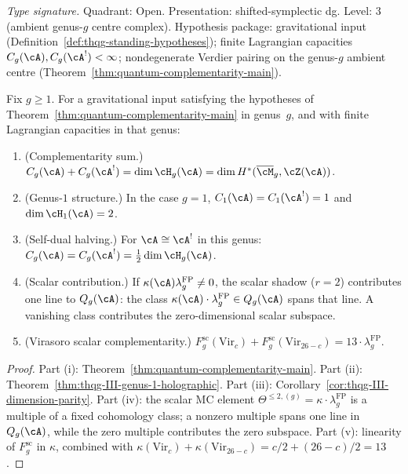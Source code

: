 \begin{theorem}
\label{thm:thqg-lagrangian-constraint}
\textit{Type signature.}
Quadrant: Open. Presentation: shifted-symplectic dg.
Level: $3$ (ambient genus-$g$ centre complex).
Hypothesis package: gravitational input
\textup{(}Definition~\ref{def:thqg-standing-hypotheses}\textup{)};
finite Lagrangian capacities $C_g(\cA), C_g(\cA^!) < \infty$;
nondegenerate Verdier pairing on the genus-$g$ ambient centre
\textup{(}Theorem~\ref{thm:quantum-complementarity-main}\textup{)}.

\medskip
Fix $g\ge1$.  For a gravitational input satisfying the hypotheses of
Theorem~\ref{thm:quantum-complementarity-main} in genus~$g$, and with
finite Lagrangian capacities in that genus:
\begin{enumerate}[label=\textup{(\roman*)}]
\item \textup{(Complementarity sum.)}
 $C_g(\cA) + C_g(\cA^!) = \dim \cH_g(\cA)
 = \dim H^*(\overline{\cM}_g, \cZ(\cA))$.

\item \textup{(Genus-$1$ structure.)}
 In the case $g=1$,
 $C_1(\cA) = C_1(\cA^!) = 1$ and $\dim \cH_1(\cA) = 2$.

\item \textup{(Self-dual halving.)}
 For $\cA \cong \cA^!$ in this genus:
 $C_g(\cA) = C_g(\cA^!)
 = \tfrac{1}{2}\dim \cH_g(\cA)$.

\item \textup{(Scalar contribution.)}
 If $\kappa(\cA)\lambda_g^{\mathrm{FP}}\neq0$, the scalar shadow
 ($r = 2$) contributes one line to $Q_g(\cA)$: the class
 $\kappa(\cA) \cdot \lambda_g^{\mathrm{FP}} \in Q_g(\cA)$
 spans that line.  A vanishing class contributes the zero-dimensional
 scalar subspace.

\item \textup{(Virasoro scalar complementarity.)}
 $F_g^{\mathrm{sc}}(\mathrm{Vir}_c) + F_g^{\mathrm{sc}}(\mathrm{Vir}_{26-c})
 = 13 \cdot \lambda_g^{\mathrm{FP}}$.
\end{enumerate}
\end{theorem}

\begin{proof}
Part (i): Theorem~\ref{thm:quantum-complementarity-main}.
Part (ii): Theorem~\ref{thm:thqg-III-genus-1-holographic}.
Part (iii): Corollary~\ref{cor:thqg-III-dimension-parity}.
Part (iv): the scalar MC element
$\Theta^{\le 2,(g)} = \kappa \cdot \lambda_g^{\mathrm{FP}}$
is a multiple of a fixed cohomology class; a nonzero multiple spans
one line in $Q_g(\cA)$, while the zero multiple contributes the zero
subspace.
Part (v): linearity of $F_g^{\mathrm{sc}}$ in $\kappa$,
combined with $\kappa(\mathrm{Vir}_c) + \kappa(\mathrm{Vir}_{26-c})
= c/2 + (26-c)/2 = 13$.
\end{proof}

